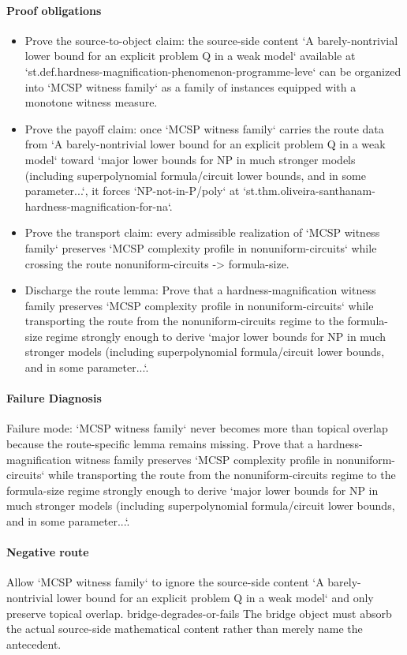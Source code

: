 \documentclass[11pt]{article}
\begin{document}
\paragraph{Proof obligations}
\begin{itemize}
\item Prove the source-to-object claim: the source-side content `A barely-nontrivial lower bound for an explicit problem Q in a weak model` available at `st.def.hardness-magnification-phenomenon-programme-leve` can be organized into `MCSP witness family` as a family of instances equipped with a monotone witness measure.
\item Prove the payoff claim: once `MCSP witness family` carries the route data from `A barely-nontrivial lower bound for an explicit problem Q in a weak model` toward `major lower bounds for NP in much stronger models (including superpolynomial formula/circuit lower bounds, and in some parameter...`, it forces `NP-not-in-P/poly` at `st.thm.oliveira-santhanam-hardness-magnification-for-na`.
\item Prove the transport claim: every admissible realization of `MCSP witness family` preserves `MCSP complexity profile in nonuniform-circuits` while crossing the route nonuniform-circuits -> formula-size.
\item Discharge the route lemma: Prove that a hardness-magnification witness family preserves `MCSP complexity profile in nonuniform-circuits` while transporting the route from the nonuniform-circuits regime to the formula-size regime strongly enough to derive `major lower bounds for NP in much stronger models (including superpolynomial formula/circuit lower bounds, and in some parameter...`.
\end{itemize}
\paragraph{Failure Diagnosis}
Failure mode: `MCSP witness family` never becomes more than topical overlap because the route-specific lemma remains missing. Prove that a hardness-magnification witness family preserves `MCSP complexity profile in nonuniform-circuits` while transporting the route from the nonuniform-circuits regime to the formula-size regime strongly enough to derive `major lower bounds for NP in much stronger models (including superpolynomial formula/circuit lower bounds, and in some parameter...`.
\paragraph{Negative route}
Allow `MCSP witness family` to ignore the source-side content `A barely-nontrivial lower bound for an explicit problem Q in a weak model` and only preserve topical overlap. bridge-degrades-or-fails The bridge object must absorb the actual source-side mathematical content rather than merely name the antecedent.
\end{document}
